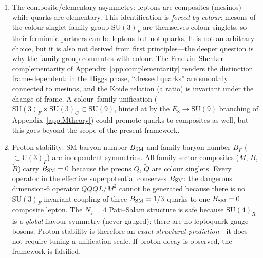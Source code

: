 \documentclass[12pt,a4paper]{article}
\newcommand{\SU}{\mathrm{SU}}
\newcommand{\UU}{\mathrm{U}}
\newcommand{\Nf}{N_f}
\begin{document}
\begin{enumerate}
    suppression~\cite{ChengSher:1987}: off-diagonal Yukawa
    couplings scale as $\sqrt{m_i m_j}/v$, with the FCNC
    amplitude further suppressed by $1/M_{H^\pm}^2$.
    For the most stringent constraint ($K^0$--$\bar K^0$ mixing),
    the tree-level exchange amplitude scales as
    $\Delta m_K^{\rm tree} \propto f_K^2\,m_K\,(m_d m_s/v^2)/M_H^2$;
    requiring $\Delta m_K^{\rm tree} < \Delta m_K^{\rm exp}$ gives
    $M_H \gtrsim O(\text{few hundred GeV})$ with Cheng--Sher couplings.
    Including QCD corrections and $B_K$ factors strengthens the
    bound to the TeV scale, consistent with $\mu_{\rm crit}$.
    A full computation of the scalar mass spectrum (which
    depends on the SUSY-breaking sector) and the resulting
    FCNC rates is needed to make this quantitative.
  \item The composite/elementary asymmetry: leptons are composites
    (mesinos) while quarks are elementary.  This identification
    is \emph{forced by colour}: mesons of the colour-singlet family
    group $\SU(3)_F$ are themselves colour singlets, so their
    fermionic partners can be leptons but not quarks.  It is not an
    arbitrary choice, but it is also not derived from first
    principles---the deeper question is why the family group commutes
    with colour.  The Fradkin--Shenker complementarity of
    Appendix~\ref{app:complementarity} renders the distinction
    frame-dependent: in the Higgs phase, ``dressed quarks'' are
    smoothly connected to mesinos, and the Koide relation (a ratio)
    is invariant under the change of frame.  A colour--family
    unification ($\SU(3)_F \times \SU(3)_C \subset \SU(9)$, hinted
    at by the $E_8 \to \SU(9)$ branching of Appendix~\ref{app:Mtheory})
    could promote quarks to composites as well, but this goes beyond
    the scope of the present framework.
  \item Proton stability: SM baryon number $B_{\rm SM}$ and family
    baryon number $B_F$ ($\subset \UU(3)_F$) are independent
    symmetries. All family-sector composites ($M$, $B$, $\tilde{B}$)
    carry $B_{\rm SM} = 0$ because the preons $Q$, $\tilde{Q}$ are
    colour singlets. Every operator in the effective superpotential
    conserves $B_{\rm SM}$: the dangerous dimension-6 operator
    $QQQL/M^2$ cannot be generated because there is no
    $\SU(3)_F$-invariant coupling of three $B_{\rm SM} = 1/3$ quarks
    to one $B_{\rm SM} = 0$ composite lepton. The
    $\Nf = 4$ Pati--Salam structure is safe because $\SU(4)_R$ is
    a \emph{global} flavour symmetry (never gauged): there are no
    leptoquark gauge bosons. Proton stability is therefore an
    \emph{exact structural prediction}---it does not require tuning
    a unification scale. If proton decay is observed, the framework
    is falsified.
\end{enumerate}
\end{document}
